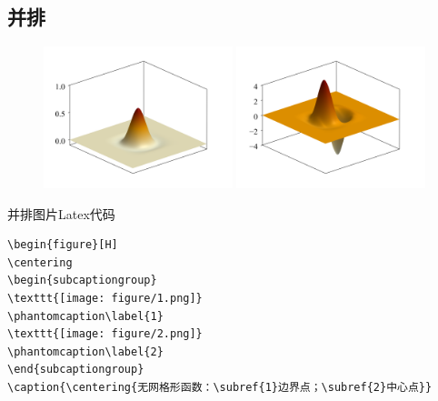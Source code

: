 \documentclass[engineeringmaster]{hquThesis}
\begin{document}
\subsection*{并排}
\begin{figure}[H]
    \centering
    \begin{subcaptiongroup}
    \includegraphics[width=0.49\textwidth]{figures/1.png}
    \label{1}
    \includegraphics[width=0.49\textwidth]{figures/2.png}
    \label{2}
    \end{subcaptiongroup}
\caption{}
\label{CHGraphsettings_fig2_meshfree}
\end{figure}
并排图片Latex代码
\begin{lstlisting}
\begin{figure}[H]
\centering
\begin{subcaptiongroup}
\texttt{[image: figure/1.png]}
\phantomcaption\label{1}
\texttt{[image: figure/2.png]}
\phantomcaption\label{2}
\end{subcaptiongroup}
\caption{\centering{无网格形函数：\subref{1}边界点；\subref{2}中心点}}
\end{lstlisting}
\newpage
\end{document}
